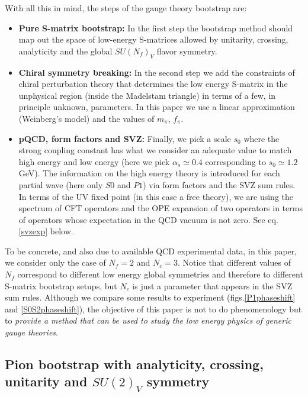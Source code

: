 \documentclass[12pt,letterpaper]{article}
\begin{document}
 With all this in mind, the steps of the gauge theory bootstrap are:
 \begin{itemize}
 	\item{\bf Pure S-matrix bootstrap:} In the first step the bootstrap method should map out the space of low-energy S-matrices allowed by unitarity, crossing, analyticity and the global $SU(N_f)_V$ flavor symmetry.
 	\item{\bf Chiral symmetry breaking:} In the second step we add the constraints of chiral perturbation theory that determines the low energy S-matrix in the unphysical region (inside the Madelstam triangle) in terms of a few, in principle unknown, parameters. In this paper we  use a linear approximation (Weinberg's model) and the values of $m_\pi$, $f_\pi$.   
 	\item{\bf pQCD, form factors and SVZ:}  Finally, we pick a scale $s_0$ where the strong coupling constant has what we consider an adequate value to match high energy and low energy (here we pick $\alpha_s\simeq 0.4$ corresponding to $s_0\simeq 1.2$GeV).
 	   	 The information on the high energy theory is introduced for each partial wave (here only $S0$ and $P1$)  via form factors and the SVZ sum rules. In terms of the UV fixed point (in this case a free theory), we are using the spectrum of CFT operators and the OPE expansion of two operators in terms of operators whose expectation in the QCD vacuum is not zero. See eq. \eqref{svzexp} below.
 \end{itemize}
 To be concrete, and also due to available QCD experimental data, in this paper, we consider only the case of $N_f=2$ and $N_c=3$. Notice that different values of $N_f$ correspond to different low energy global symmetries and therefore to different S-matrix bootstrap setups, but $N_c$ is just a parameter that appears in the SVZ sum rules. Although we compare some results to experiment (figs.\ref{P1phaseshift} and \ref{S0S2phaseshift}), the objective of this paper is not to do phenomenology but to {\it provide a method that can be used to study the low energy physics of generic gauge theories}.
 
\subsection{Pion bootstrap with analyticity, crossing, unitarity and $SU(2)_V$ symmetry}         
  
\end{document}
